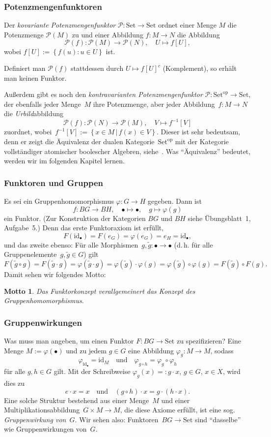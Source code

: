 \documentclass[a4paper,ngerman]{scrartcl}
\theoremstyle{definition}
\theoremstyle{plain}
\newtheorem{motto}[defn]{Motto}
\theoremstyle{remark}
\newcommand{\id}{\mathrm{id}}
\newcommand{\op}{\mathrm{op}}
\newcommand{\Set}{\mathrm{Set}}
\newcommand\subsubsubsection[1]{\subsubsection*{#1}}
\begin{document}
\subsubsubsection{Potenzmengenfunktoren}

Der \emph{kovariante Potenzmengenfunktor} $\mathcal{P} : \Set \to \Set$ ordnet einer Menge $M$ die Potenzmenge $\mathcal{P}(M)$ zu und einer Abbildung $f : M \to N$ die Abbildung
\[ \mathcal{P}(f) : \mathcal{P}(M) \to \mathcal{P}(N), \quad U \mapsto f[U], \]
wobei $f[U] := \left\{ f(u) : u \in U \right\}$ ist.

Definiert man $\mathcal{P}(f)$ stattdessen durch $U \mapsto f[U]^c$
(Komplement), so erhält man keinen Funktor.

Außerdem gibt es noch den \emph{kontravarianten Potenzmengenfunktor}
$\mathcal{P} : \Set^\op \to \Set$, der ebenfalls jeder Menge~$M$ ihre
Potenzmenge, aber jeder Abbildung~$f : M \to N$ die \emph{Urbild}abbildung
\[ \mathcal{P}(f) : \mathcal{P}(N) \to \mathcal{P}(M), \quad V \mapsto
f^{-1}[V] \]
zuordnet, wobei~$f^{-1}[V] := \left\{ x \in M \,|\, f(x) \in V \right\}$.
Dieser ist sehr bedeutsam, denn er zeigt die Äquivalenz der dualen
Kategorie~$\Set^\op$ mit der Kategorie vollständiger atomischer boolescher
Algebren, siehe~\cite[Thm.~2.4]{oosten}. Was "`Äquivalenz"' bedeutet, werden
wir im folgenden Kapitel lernen.


\subsubsection{Funktoren und Gruppen}

Es sei ein Gruppenhomomorphismus $\varphi : G \to H$ gegeben. Dann ist
  \[ f : BG \to BH, \quad \bullet \mapsto \bullet, \quad g \mapsto \varphi(g) \]
ein Funktor. (Zur Konstruktion der Kategorien $BG$ und $BH$ siehe Übungsblatt~1, Aufgabe~5.)
Denn das erste Funktoraxiom ist erfüllt,
\[
  F(\id_\bullet) = F(e_G) = \varphi(e_G) = e_H = \id_\bullet,
\]
und das zweite ebenso: Für alle Morphismen~$g, \tilde g : \bullet \to \bullet$
(d.\,h. für alle Gruppenelemente~$g, \tilde g \in G$) gilt
\[
  F(\tilde{g} \circ g) = F(\tilde{g} \cdot g) = \varphi(\tilde{g} \cdot g) =
  \varphi(\tilde{g}) \cdot \varphi(g) = \varphi(\tilde{g}) \circ \varphi(g) =
  F(\tilde{g}) \circ F(g). \]
Damit sehen wir folgendes Motto:
\begin{motto}Das Funktorkonzept verallgemeinert das Konzept des
Gruppenhomomorphismus.\end{motto}

\subsubsubsection{Gruppenwirkungen}

Was muss man angeben, um einen Funktor $F : BG \to \Set$ zu spezifizieren? Eine
Menge $M := \varphi(\bullet)$ und zu jedem $g \in G$ eine Abbildung $\varphi_g : M \to M$, sodass
\[ \varphi_{\id_\bullet} = \id_M \quad \text{und} \quad \varphi_{g \circ h} = \varphi_g \circ \varphi_h \]
für alle $g, h \in G$ gilt. Mit der Schreibweise $\varphi_g(x) =: g \cdot x$, $g \in G$, $x \in X$, wird dies zu
\[ e \cdot x = x \quad \text{und} \quad (g \circ h) \cdot x = g \cdot (h \cdot x).\]
Eine solche Struktur bestehend aus einer Menge~$M$ und einer
Multiplikationsabbildung~$G \times M \to M$, die diese Axiome erfüllt, ist eine
sog. \emph{Gruppenwirkung von~$G$}. Wir sehen also: Funktoren~$BG \to \Set$
sind "`dasselbe"' wie Gruppenwirkungen von~$G$.
\end{document}
